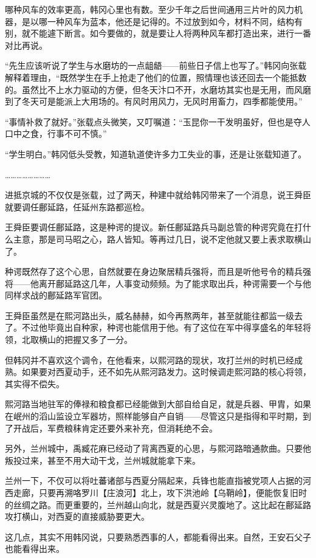 哪种风车的效率更高，韩冈心里也有数。至少千年之后世间通用三片叶的风力机器，是以哪一种风车为蓝本，他还是记得的。不过放到如今，材料不同，结构有别，就不能遽下断言。如今要做的，就是要让人将两种风车都打造出来，进行一番对比再说。

“先生应该听说了学生与水磨坊的一点龃龉——前些日子信上也写了。”韩冈向张载解释着理由，“既然学生在手上抢走了他们的位置，照情理也该还回去一个能抵数的。虽然比不上水力驱动的方便，但冬天汴口不开，水磨坊其实也是无用，而风磨到了冬天可是能派上大用场的。有风时用风力，无风时用畜力，四季都能使用。”

“事情补救了就好。”张载点头微笑，又叮嘱道：“玉昆你一干发明虽好，但也是夺人口中之食，行事不可不慎。”

“学生明白。”韩冈低头受教，知道轨道使许多力工失业的事，还是让张载知道了。

……………………

进抵京城的不仅仅是张载，过了两天，种建中就给韩冈带来了一个消息，说王舜臣就要调任鄜延路，任延州东路都巡检。

王舜臣要调任鄜延路，这是种谔的提议。新任鄜延路兵马副总管的种谔究竟在打什么主意，那是司马昭之心，路人皆知。等再过几日，说不定他就又要上表求取横山了。

种谔既然存了这个心思，自然就要在身边聚居精兵强将，而且是听他号令的精兵强将——他离开鄜延路这几年，人事变动频频。为了能求取出兵，种谔需要一个与他同样求战的鄜延路军官团。

王舜臣虽然是在熙河路出头，威名赫赫，如今再熬两年，甚至就能往都监一级去了。不过他毕竟出自种家，种谔也能信用于他。有了这位在军中得享盛名的年轻将领，北取横山的把握又多了一分。

但韩冈并不喜欢这个调令，在他看来，以熙河路的现状，攻打兰州的时机已经成熟。如果要对西夏动手，还不如先从熙河路发力。这时候调走熙河路的核心将领，其实得不偿失。

熙河路当地驻军的俸禄和粮食都已经能做到大部自给自足，就是兵器、甲胄，如果在岷州的滔山监设立军器坊，照样能够自产自销——尽管这只是指得和平时期，到了开战后，军费粮秣肯定还要外来补充，但消耗绝不会。

另外，兰州城中，禹臧花麻已经动了背离西夏的心思，与熙河路暗通款曲。只要他叛投过来，甚至不用大动干戈，兰州城就能拿下来。

兰州一下，不仅可以将吐蕃诸部与西夏分隔起来，兵锋也能直指被党项人占据的河西走廊，只要再溯咯罗川【庄浪河】北上，攻下洪池岭【乌鞘岭】，便能恢复旧时的丝绸之路。而更重要的，兰州越山向北，就是西夏兴灵腹地了。这比起在鄜延路攻打横山，对西夏的直接威胁要更大。

这几点，其实不用韩冈说，只要熟悉西事的人，都能看得出来。自然，王安石父子也能看得出来。

